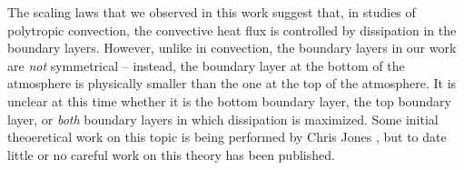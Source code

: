 The scaling laws that we observed in this work suggest that, in studies of polytropic convection, the convective heat flux is controlled by dissipation in the boundary layers.
However, unlike in \RB convection, the boundary layers in our work are \emph{not} symmetrical -- instead, the boundary layer at the bottom of the atmosphere is physically smaller than the one at the top of the atmosphere.
It is unclear at this time whether it is the bottom boundary layer, the top boundary layer, or \emph{both} boundary layers in which dissipation is maximized.
Some initial theoeretical work on this topic is being performed by Chris Jones \citep[as presented in ][]{jones&all2019}, but to date little or no careful work on this theory has been published.
